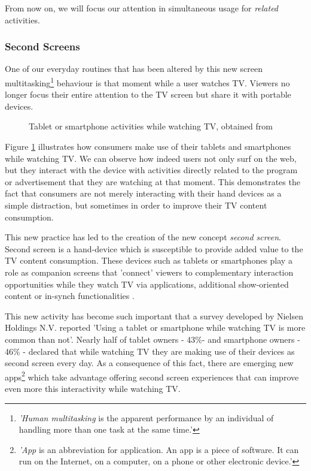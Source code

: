 \documentclass{acm_proc_article-sp}
\begin{document}
From now on, we will focus our attention in simultaneous usage for \textit{related} activities.
 	
\subsubsection{Second Screens}

One of our everyday routines that has been altered by this new screen multitasking\cite{wiki:multitask}\footnote{\textit{'Human multitasking} is the apparent performance by an individual of handling more than one task at the same time.'} behaviour is that moment while a user watches TV. Viewers no longer focus their entire attention to the TV screen but share it with portable devices. 

\begin{figure}[!htb]
	\centering
	\caption{Tablet or smartphone activities while watching TV, obtained from \cite{nielsentv}}
	\label{fig:nielsengraph}
\end{figure}

Figure \ref{fig:nielsengraph} illustrates how consumers make use of their tablets and smartphones while watching TV. We can observe how indeed users not only surf on the web, but they interact with the device with activities directly related to the program or advertisement that they are watching at that moment. This demonstrates the fact that consumers are not merely interacting with their hand devices as a simple distraction, but sometimes in order to improve their TV content consumption. 

This new practice has led to the creation of the new concept \textit{second screen}. Second screen is a hand-device which is susceptible to provide added value to the TV content consumption. These devices such as tablets or smartphones play a role as companion
screens that 'connect' viewers to complementary interaction
opportunities while they watch TV via applications, additional
show-oriented content or in-synch functionalities \cite{evolumedia2}. 

This new activity has become such important that a survey developed by Nielsen Holdings N.V. \cite{nielsentv} reported 'Using a tablet or smartphone while watching TV is more common than not'. Nearly half of tablet owners - 43\%- and smartphone owners - 46\% - declared that while watching TV they are making use of their devices as second screen every day. As a consequence of this fact, there are emerging new apps\cite{wiki:app}\footnote{\textit{'App} is an abbreviation for application. An app is a piece of software. It can run on the Internet, on a computer, on a phone or other electronic device.'} which take advantage offering second screen experiences that can improve even more this interactivity while watching TV. 
\end{document}
